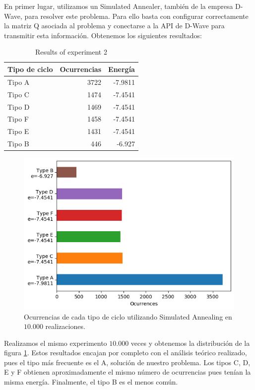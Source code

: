 \documentclass[11pt]{article}
\begin{document}
En primer lugar, utilizamos un Simulated Annealer, también de la empresa D-Wave, para resolver este problema. Para ello basta con configurar correctamente la matriz Q asociada al problema y conectarse a la API de D-Wave para transmitir esta información. Obtenemos los siguientes resultados:

\begin{table}[H]
	\centering
	\begin{tabular}{lrr}
		\textbf{Tipo de ciclo} & \textbf{Ocurrencias} & \textbf{Energía} \\
		\hline
		Tipo A	& 3722	& -7.9811	\\
		Tipo C	& 1474	& -7.4541	\\
		Tipo D	& 1469	& -7.4541	\\
		Tipo F	& 1458	& -7.4541	\\
		Tipo E	& 1431	& -7.4541	\\
		Tipo B	& 446	& -6.927                             
	\end{tabular}
	\caption{Results of experiment 2}
	\label{tab:exp2}
\end{table}

\begin{figure}[H]
	\includegraphics[scale=0.8]{figures/experiment2.png}
	\centering
	\caption{Ocurrencias de cada tipo de ciclo utilizando Simulated Annealing en $10.000$ realizaciones.}
	\label{fig:exp2-occ}
\end{figure}

Realizamos el mismo experimento $10.000$ veces y obtenemos la distribución de la figura \ref{fig:exp2-occ}. Estos resultados encajan por completo con el análisis teórico realizado, pues el tipo más frecuente es el A, solución de nuestro problema. Los tipos C, D, E y F obtienen aproximadamente el mismo número de ocurrencias pues tenían la misma energía. Finalmente, el tipo B es el menos común. \\
\end{document}

